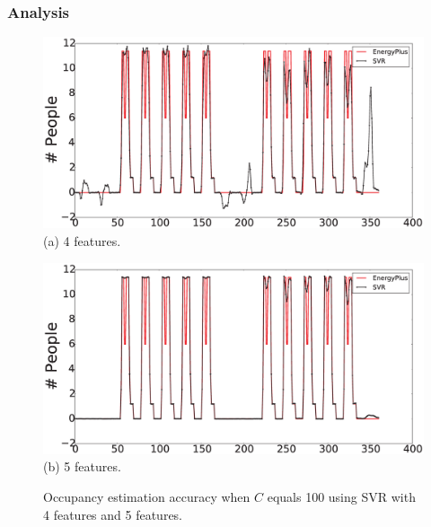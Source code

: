 \subsubsection{Analysis}
\begin{figure}[h]
\begin{minipage}{\textwidth}
\centering\includegraphics[width=5in]{./Pics/100C4Features.eps}
(a) 4 features.
\end{minipage}
\hfill

\vspace{3ex}

\noindent\begin{minipage}{\textwidth}
\centering\includegraphics[width=5in]{./Pics/100C5Features.eps}
(b) 5 features.
\end{minipage}
\hfill
\caption{Occupancy estimation accuracy when $C$ equals 100 using SVR with 4 features and 5 features.}\label{fig:compare1}
\end{figure}

